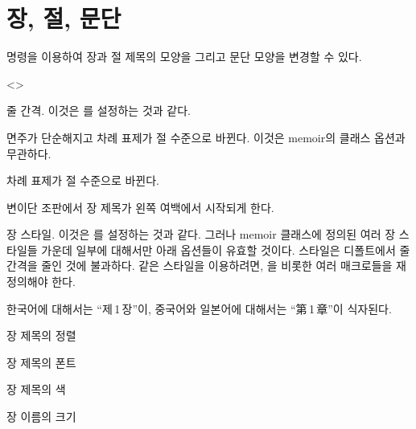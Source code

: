 \documentclass[minted]{hzguide}
\begin{document}
\section{장, 절, 문단}

\macro{\HeadingSetup} 명령을 이용하여 장과 절 제목의 모양을 그리고 문단 모양을 변경할 수 있다. 

\begin{code}
\end{code}

\begin{macros}<\HeadingSetup>
\item[linespacing]  
줄 간격. 이것은 \macro{\baselinestretch}를 설정하는 것과 같다.

\item[article] \keyvalueTF
면주가 단순해지고 차례 표제가 절 수준으로 바뀐다. 
이것은 memoir의  클래스 옵션과 무관하다.

\item[cftsection] \keyvalueTF
차례 표제가 절 수준으로 바뀐다. 

\item[chapterwider] \keyvalueTF
변이단 조판에서 장 제목가 왼쪽 여백에서 시작되게 한다.

\item[chapterstyle] 
장 스타일. 이것은 \macro{\chapterstyle}를 설정하는 것과 같다. 
그러나 memoir 클래스에 정의된 여러 장 스타일들 가운데 일부에 대해서만 아래 옵션들이 유효할 것이다.
 스타일은 디폴트에서 줄 간격을 줄인 것에 불과하다.
 같은 스타일을 이용하려면, \macro{\printerchaptername}을 비롯한 여러 매크로들을 재정의해야 한다.

\item[cjkchapter] \keyvalueTF
한국어에 대해서는 ``제\,1\,장''이, 중국어와 일본어에 대해서는 ``第\,1\,章''이 식자된다.

\item[chapteralign] \keyvalue{\raggedleft, \centering, \raggedright}
장 제목의 정렬

\item[chapterfont] \keyvalue{\normalfont\bfseries}
장 제목의 폰트

\item[chaptercolor] 
장 제목의 색

\item[chapternamesize] \keyvalue{\huge}
장 이름의 크기 


\end{macros}
\end{document}
